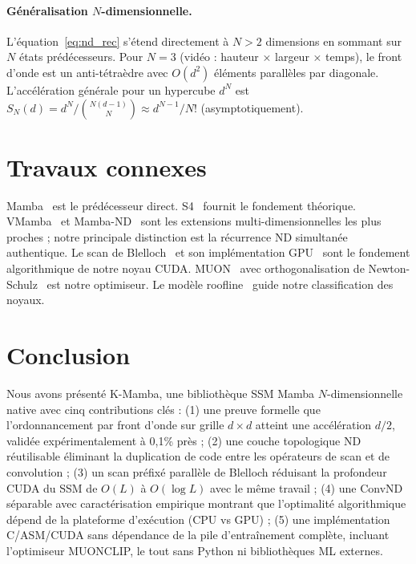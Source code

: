 \documentclass[10pt,onecolumn]{article}
\begin{document}
\paragraph{Généralisation $N$-dimensionnelle.}
L'équation~\eqref{eq:nd_rec} s'étend directement à $N > 2$ dimensions
en sommant sur $N$ états prédécesseurs.
Pour $N = 3$ (vidéo : hauteur × largeur × temps), le front d'onde est
un anti-tétraèdre avec $O(d^2)$ éléments parallèles par diagonale.
L'accélération générale pour un hypercube $d^N$ est
$S_N(d) = d^N / \binom{N(d-1)}{N} \approx d^{N-1}/N!$
(asymptotiquement).

\section{Travaux connexes}

Mamba~\cite{mamba2023} est le prédécesseur direct.
S4~\cite{s4} fournit le fondement théorique.
VMamba~\cite{vmamba} et Mamba-ND~\cite{mamband} sont les extensions
multi-dimensionnelles les plus proches ; notre principale distinction est la
récurrence ND simultanée authentique.
Le scan de Blelloch~\cite{blelloch1990} et son implémentation GPU~\cite{harris2007gpu}
sont le fondement algorithmique de notre noyau CUDA.
MUON~\cite{muon2025} avec orthogonalisation de Newton-Schulz~\cite{bjorck1971}
est notre optimiseur.
Le modèle roofline~\cite{williams2009roofline} guide notre classification des noyaux.

\section{Conclusion}

Nous avons présenté K-Mamba, une bibliothèque SSM Mamba $N$-dimensionnelle native
avec cinq contributions clés : (1) une preuve formelle que l'ordonnancement
par front d'onde sur grille $d \times d$ atteint une accélération $d/2$,
validée expérimentalement à 0,1\% près ; (2) une couche topologique ND réutilisable
éliminant la duplication de code entre les opérateurs de scan et de convolution ;
(3) un scan préfixé parallèle de Blelloch réduisant la profondeur CUDA du SSM
de $O(L)$ à $O(\log L)$ avec le même travail ;
(4) une ConvND séparable avec caractérisation empirique montrant que l'optimalité
algorithmique dépend de la plateforme d'exécution (CPU vs GPU) ;
(5) une implémentation C/ASM/CUDA sans dépendance de la pile d'entraînement complète,
incluant l'optimiseur MUONCLIP, le tout sans Python ni bibliothèques ML externes.
\end{document}
